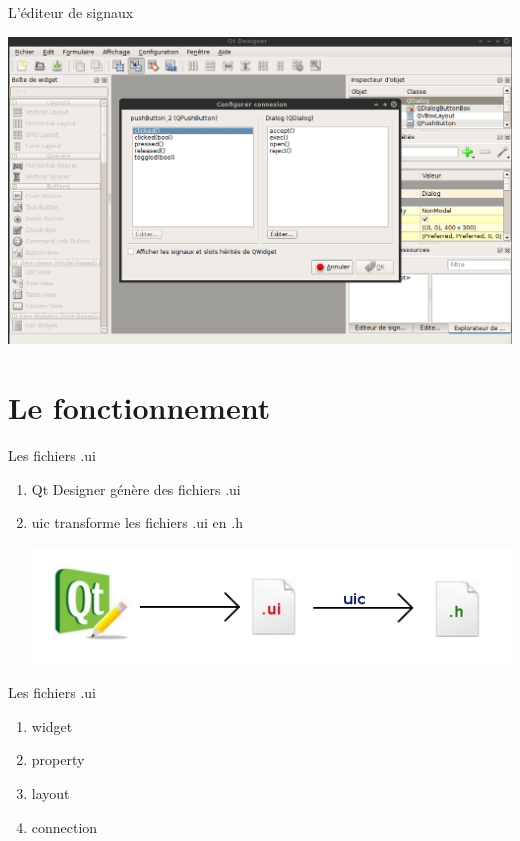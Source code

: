 \documentclass{beamer}
\begin{document}
\begin{frame}[fragile]{L'éditeur de signaux}
 \begin{center}
  \includegraphics[scale=0.30]{Signaux3.png}
 \end{center}
\end{frame}

\section{Le fonctionnement}
\begin{frame}[fragile]{Les fichiers .ui}
 \begin{enumerate}
  \item Qt Designer génère des fichiers .ui
  \item uic transforme les fichiers .ui en .h
  \begin{center}
   \includegraphics[scale=0.60]{comp.jpg}
  \end{center}
 \end{enumerate}
\end{frame} 

\begin {frame}[fragile]{Les fichiers .ui}
 \begin{enumerate}
  \item widget
  \item property
  \item layout
  \item connection
 \end{enumerate}
\end{frame}
\end{document}
